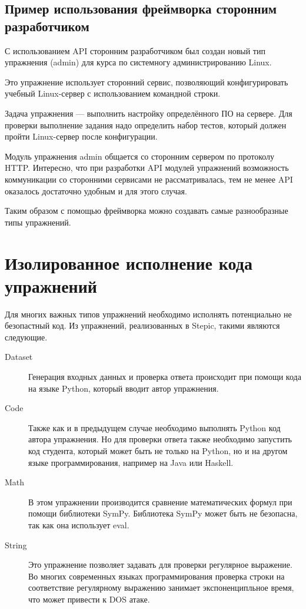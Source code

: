 \documentclass{matmex-diploma-custom}
\begin{document}
\subsection{Пример использования фреймворка сторонним разработчиком}

С использованием API сторонним разработчиком был создан новый тип
упражнения (admin) для курса по системногу администрированию Linux.

Это упражнение использует сторонний сервис, позволяющий
конфигурировать учебный Linux-сервер с использованием командной
строки.

Задача упражнения --- выполнить настройку определённого ПО на
сервере. Для проверки выполнение задания надо определить набор тестов,
который должен пройти Linux-сервер после конфигурации.

Модуль упражнения admin общается со сторонним сервером по протоколу
HTTP. Интересно, что при разработки API модулей упражнений возможность
коммуникации со сторонними сервисами не рассматривалась, тем не менее
API оказалось достаточно удобным и для этого случая.

Таким образом с помощью фреймворка можно создавать самые разнообразные
типы упражнений.

\section{Изолированное исполнение кода упражнений}

Для многих важных типов упражнений необходимо исполнять потенциально
не безопастный код. Из упражнений, реализованных в Stepic, такими
являются следующие.
\begin{description}
\item[Dataset] Генерация входных данных и проверка ответа происходит
  при помощи кода на языке Python, который вводит автор упражнения.
\item[Code] Также как и в предыдущем случае необходимо выполнять
  Python код автора упражнения. Но для проверки ответа также
  необходимо запустить код студента, который может быть не только на
  Python, но и на другом языке программирования, например на Java или
  Haskell.
\item[Math] В этом упражнении производится сравнение математических
  формул при помощи библиотеки SymPy. Библиотека SymPy может быть не
  безопасна, так как она использует eval.
\item[String] Это упражнение позволяет задавать для проверки
  регулярное выражение. Во многих современных языках программирования
  проверка строки на соответствие регулярному выражению занимает
  экспоненципльное время, что может привести к DOS атаке.
\end{description}
\end{document}
